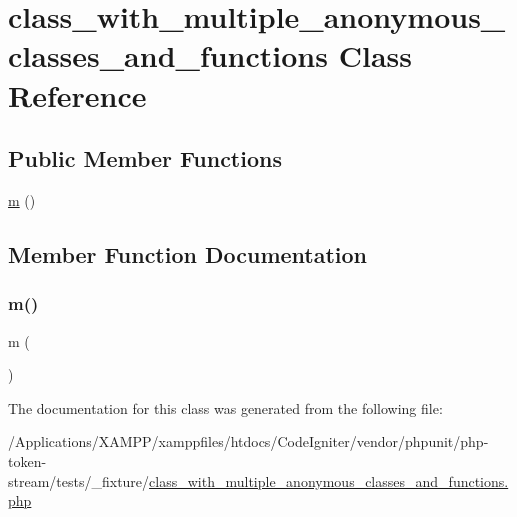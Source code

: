 \hypertarget{classclass__with__multiple__anonymous__classes__and__functions}{}\section{class\+\_\+with\+\_\+multiple\+\_\+anonymous\+\_\+classes\+\_\+and\+\_\+functions Class Reference}
\label{classclass__with__multiple__anonymous__classes__and__functions}
\subsection*{Public Member Functions}
\begin{DoxyCompactItemize}
\item 
\mbox{\hyperlink{classclass__with__multiple__anonymous__classes__and__functions_aa39e8f58efe393a7afe875374c9afc97}{m}} ()
\end{DoxyCompactItemize}


\subsection{Member Function Documentation}
\mbox{\label{classclass__with__multiple__anonymous__classes__and__functions_aa39e8f58efe393a7afe875374c9afc97}} 
\subsubsection{\texorpdfstring{m()}{m()}}
{\footnotesize\ttfamily m (\begin{DoxyParamCaption}{ }\end{DoxyParamCaption})}



The documentation for this class was generated from the following file\+:\begin{DoxyCompactItemize}
\item 
/\+Applications/\+X\+A\+M\+P\+P/xamppfiles/htdocs/\+Code\+Igniter/vendor/phpunit/php-\/token-\/stream/tests/\+\_\+fixture/\mbox{\hyperlink{class__with__multiple__anonymous__classes__and__functions_8php}{class\+\_\+with\+\_\+multiple\+\_\+anonymous\+\_\+classes\+\_\+and\+\_\+functions.\+php}}\end{DoxyCompactItemize}
